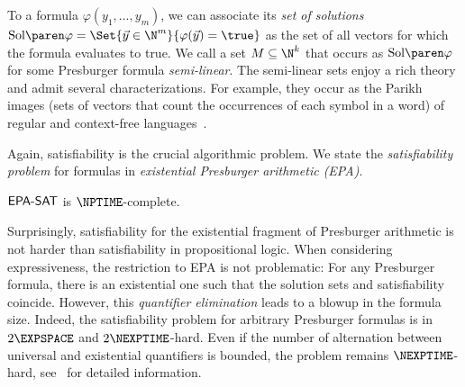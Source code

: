 \documentclass[../../diss.tex]{subfiles}
\begin{document}
To a formula $\varphi(y_1, \ldots, y_m)$, we can associate its \emph{set of solutions}
$\Sol{\varphi} = \Set{ \vec{y} \in \N^m}{ \varphi(\vec{y}) = \true}$ as the set of all vectors for which the formula evaluates to true.
We call a set $M \subseteq \N^k$ that occurs as $\Sol{\varphi}$ for some Presburger formula \emph{semi-linear}.
The semi-linear sets enjoy a rich theory and admit several characterizations.
For example, they occur as the Parikh images (sets of vectors that count the occurrences of each symbol in a word) of regular and context-free languages~\cite{Parikh66}.

Again, satisfiability is the crucial algorithmic problem.
We state the \emph{satisfiability problem} for formulas in \emph{existential Presburger arithmetic (EPA)}.

\begin{problem}
    \problemshort{($\EPASAT$)}
\end{problem}

\begin{theorem}%
\label{Theorem:SatisfiabilityEPA}%
    $\EPASAT$ is $\NPTIME$-complete.
\end{theorem}

Surprisingly, satisfiability for the existential fragment of Presburger arithmetic is not harder than satisfiability in propositional logic.
When considering expressiveness, the restriction to EPA is not problematic:
For any Presburger formula, there is an existential one such that the solution sets and satisfiability coincide.
However, this \emph{quantifier elimination} leads to a blowup in the formula size.
Indeed, the satisfiability problem for arbitrary Presburger formulas is in $2\EXPSPACE$ and $2\NEXPTIME$-hard.
Even if the number of alternation between universal and existential quantifiers is bounded, the problem remains $\NEXPTIME$-hard, see~\cite{Haase14} for detailed information.
\end{document}
